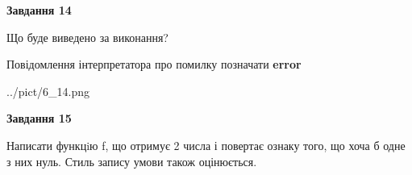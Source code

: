 \documentclass[11pt, ukrainian]{article}
\begin{document}
{\begin {large}
{\begin {center}\textbf{Завдання 14}\end {center}}\par
Що буде виведено за виконання? \par
Повідомлення інтерпретатора про помилку позначати \textbf{error}

\begin{center}
	{../pict/6_14.png}
\end{center}
\newpage

{\begin {center}\textbf{Завдання 15}\end {center}}\par

Написати функцiю f, що отримує 2 числа і повертає ознаку того, що хоча б одне з них нуль. Стиль запису умови також оцінюється.\par
\newpage

\end {large}}
\end{document}
